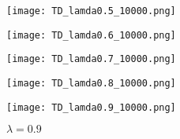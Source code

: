 \documentclass{beamer}
\begin{document}
\begin{frame}
\begin{figure}[ht]
        \begin{minipage}[b]{0.15\linewidth}
        \centering
        \texttt{[image: TD\_lamda0.5\_10000.png]}
        {\caption*{$\lambda = 0.5$}}
        \end{minipage}
        \hspace{0.02 \linewidth}
        \begin{minipage}[b]{0.15\linewidth}
        \centering
        \texttt{[image: TD\_lamda0.6\_10000.png]}
        {\caption*{$\lambda = 0.6$}}
        \end{minipage}
        \hspace{0.02 \linewidth}
        \begin{minipage}[b]{0.15\linewidth}
        \centering
        \texttt{[image: TD\_lamda0.7\_10000.png]}
        {\caption*{$\lambda = 0.7$}}
        \end{minipage}
        \hspace{0.02 \linewidth}
        \begin{minipage}[b]{0.15\linewidth}
        \centering
        \texttt{[image: TD\_lamda0.8\_10000.png]}
        {\caption*{$\lambda = 0.8$}}
        \end{minipage}
        \hspace{0.02 \linewidth}
        \hspace{0.02 \linewidth}
        \begin{minipage}[b]{0.15\linewidth}
        \centering
        \texttt{[image: TD\_lamda0.9\_10000.png]}
        {\caption*{$\lambda = 0.9$}}
        \end{minipage}
        \hspace{0.02 \linewidth}

        \end{figure}
\end{frame}
\end{document}
